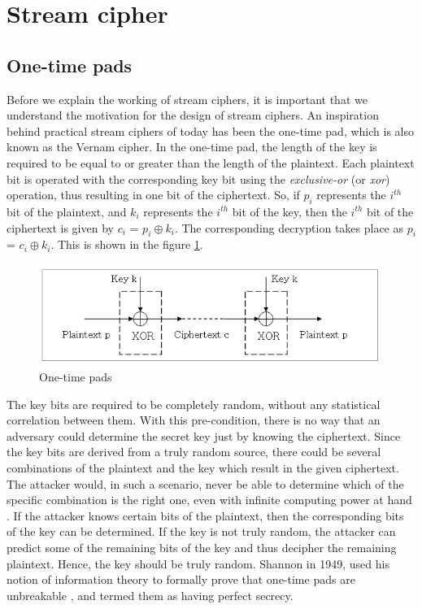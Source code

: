 \section{Stream cipher}
\label{sec:stream-cipher}

\subsection{One-time pads} 
\label{sec:one-time-pads}

Before we explain the working of stream ciphers, it is important that we understand the motivation for the design of stream ciphers. An inspiration behind practical stream ciphers of today has been the one-time pad, which is also known as the Vernam cipher. In the one-time pad, the length of the key is required to be equal to or greater than the length of the plaintext. Each plaintext bit is operated with the corresponding key bit using the \emph{exclusive-or} (or \emph{xor}) operation, thus resulting in one bit of the ciphertext. So, if $p_i$ represents the $i^{th}$ bit of the plaintext, and $k_i$ represents the $i^{th}$ bit of the key, then the $i^{th}$ bit of the ciphertext is given by $c_i$ = $p_i \oplus k_i$. The corresponding decryption takes place as $p_i$ = $c_i \oplus k_i$. This is shown in the figure \ref{fig:one-time-pad}.

\begin{figure}[ht!]
	\centering
		\includegraphics[width=4.4in]{./figures/one-time-pad.PNG}
	\caption{One-time pads}	
	\label{fig:one-time-pad}
\end{figure}

The key bits are required to be completely random, without any statistical correlation between them. With this pre-condition, there is no way that an adversary could determine the secret key just by knowing the ciphertext. Since the key bits are derived from a truly random source, there could be several combinations of the plaintext and the key which result in the given ciphertext. The attacker would, in such a scenario, never be able to determine which of the specific combination is the right one, even with infinite computing power at hand \cite{one-time-pads-link}. If the attacker knows certain bits of the plaintext, then the corresponding bits of the key can be determined. If the key is not truly random, the attacker can predict some of the remaining bits of the key and thus decipher the remaining plaintext. Hence, the key should be truly random. 
Shannon in 1949, used his notion of information theory to formally prove that one-time pads are unbreakable \cite{shannon1949cts}, and termed them as having perfect secrecy.

